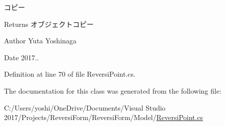 コピー 

\begin{DoxyReturn}{Returns}
オブジェクトコピー 
\end{DoxyReturn}
\begin{DoxyAuthor}{Author}
Yuta Yoshinaga 
\end{DoxyAuthor}
\begin{DoxyDate}{Date}
2017.. 
\end{DoxyDate}


Definition at line 70 of file Reversi\+Point.\+cs.



The documentation for this class was generated from the following file\+:\begin{DoxyCompactItemize}
\item 
C\+:/\+Users/yoshi/\+One\+Drive/\+Documents/\+Visual Studio 2017/\+Projects/\+Reversi\+Form/\+Reversi\+Form/\+Model/\hyperlink{_reversi_point_8cs}{Reversi\+Point.\+cs}\end{DoxyCompactItemize}
